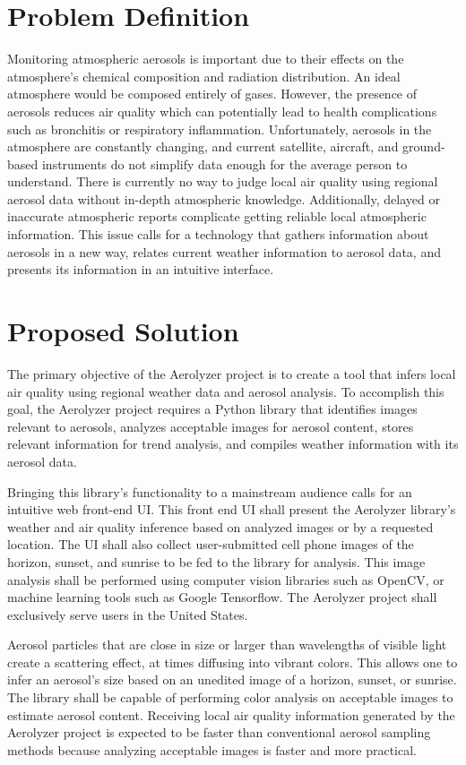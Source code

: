 \documentclass[letterpaper,10pt,draftclsnofoot,onecolumn]{IEEEtran}
\newcommand\tab[1][1cm]{\hspace*{#1}}
\begin{document}
\clearpage
\begin{flushleft}
\section{Problem Definition}
\tab Monitoring atmospheric aerosols is important due to their effects on the atmosphere's chemical composition and radiation distribution. An ideal atmosphere would be composed entirely of gases. However, the presence of aerosols reduces air quality which can potentially lead to health complications such as bronchitis or respiratory inflammation. Unfortunately, aerosols in the atmosphere are constantly changing, and current satellite, aircraft, and ground-based instruments do not simplify data enough for the average person to understand. There is currently no way to judge local air quality using regional aerosol data without in-depth atmospheric knowledge. Additionally, delayed or inaccurate atmospheric reports complicate getting reliable local atmospheric information. This issue calls for a technology that gathers information about aerosols in a new way, relates current weather information to aerosol data, and presents its information in an intuitive interface.

\section{Proposed Solution}
\tab The primary objective of the Aerolyzer project is to create a tool that infers local air quality using regional weather data and aerosol analysis. To accomplish this goal, the Aerolyzer project requires a Python library that identifies images relevant to aerosols, analyzes acceptable images for aerosol content, stores relevant information for trend analysis, and compiles weather information with its aerosol data. 
\par
\tab Bringing this library's functionality to a mainstream audience calls for an intuitive web front-end UI. This front end UI shall present the Aerolyzer library's weather and air quality inference based on analyzed images or by a requested location. The UI shall also collect user-submitted cell phone images of the horizon, sunset, and sunrise to be fed to the library for analysis. This image analysis shall be performed using computer vision libraries such as OpenCV, or machine learning tools such as Google Tensorflow. The Aerolyzer project shall exclusively serve users in the United States.

\par
\tab Aerosol particles that are close in size or larger than wavelengths of visible light create a scattering effect, at times diffusing into vibrant colors. This allows one to infer an aerosol's size based on an unedited image of a horizon, sunset, or sunrise. The library shall be capable of performing color analysis on acceptable images to estimate aerosol content. Receiving local air quality information generated by the Aerolyzer project is expected to be faster than conventional aerosol sampling methods because analyzing acceptable images is faster and more practical.


\end{flushleft}
\end{document}
